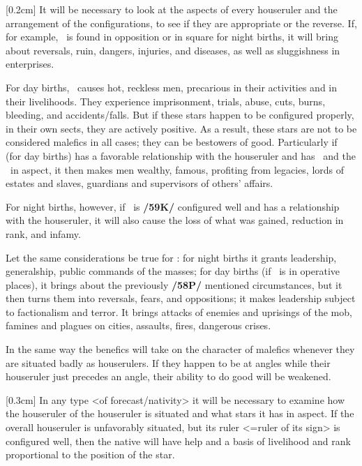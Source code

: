[0.2cm]
It will be necessary to look at the aspects of every houseruler and the arrangement of the configurations, to see if they are appropriate or the reverse. If, for example, \Saturn\, is found in opposition or in square for night births, it will bring about reversals, ruin, dangers, injuries, and diseases, as well as sluggishness in enterprises. 

For day births, \Mars\, causes hot, reckless men, precarious in their activities and in their livelihoods. They experience imprisonment, trials, abuse, cuts, burns, bleeding, and accidents/falls. But \mnmb if these stars happen to be configured properly, in their own sects, they are actively positive. As a result, these stars are not to be considered malefics in all cases; they can be bestowers of good. Particularly if \Saturn\, (for day births) has a favorable relationship with the houseruler and has \Jupiter\, and the \Sun\, in aspect, it then makes men wealthy, famous, profiting from legacies, lords of estates and slaves, guardians and supervisors of others' affairs. 

For night births, however, if \Saturn\, is \textbf{/59K/} configured well and has a relationship with the houseruler, it will also cause the loss of what was gained, reduction in rank, and infamy. 

Let the same considerations be true for \Mars: for night births it grants leadership, generalship, public commands of the masses; for day births (if \Mars\, is in operative places), it brings about the previously \textbf{/58P/} mentioned circumstances, but it then turns them into reversals, fears, and oppositions; it makes leadership subject to factionalism and terror. It brings attacks of enemies and uprisings of the mob, famines and plagues on cities, assaults, fires, dangerous crises.

\mnbm[0.2cm] 
In the same way the benefics will take on the character of malefics whenever they are situated badly as houserulers. If they happen to be at angles while their houseruler just precedes an angle, their ability to do good will be weakened. 

[0.3cm]
In any type <of forecast/nativity> it will be necessary to examine how the houseruler of the houseruler is situated and what stars it has in aspect. If the overall houseruler is
unfavorably situated, but its ruler <=ruler of its sign> is configured well, then the native will have help and
a basis of livelihood and rank proportional to the position of the star.

\newpage